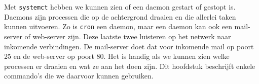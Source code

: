 Met \texttt{systemct} hebben we kunnen zien of een daemon gestart of gestopt is. Daemons zijn processen die op de achtergrond draaien en die allerlei taken kunnen uitvoeren. Zo is \texttt{cron} een daemon, maar een daemon kan ook een mail-server of web-server zijn. Deze laatste twee luisteren op het netwerk naar inkomende verbindingen. De mail-server doet dat voor inkomende mail op poort 25 en de web-server op poort 80. Het is handig als we kunnen zien welke processen er draaien en wat ze aan het doen zijn. Dit hoofdstuk beschrijft enkele commando's die we daarvoor kunnen gebruiken.
